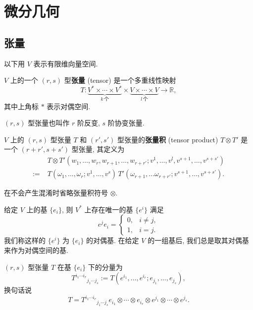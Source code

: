 \chapter{微分几何}
\label{differential geometry}
\section{张量}
\begin{remark}
    以下用 $ V $ 表示有限维向量空间.
\end{remark}
\begin{definition}[张量]
    $ V $ 上的一个 $ (r,s) $ 型{\bf 张量} (tensor) 是一个多重线性映射
    \[ T:\underbrace{V^*\times\cdots\times V^*}_{k\,\textrm{个}}\times \underbrace{V\times\cdots\times V}_{l\,\textrm{个}}\to\mathbb{R}, \]
    其中上角标 $ * $ 表示对偶空间. 
\end{definition}

\begin{remark}
    $ (r,s) $ 型张量也叫作 $ r $ 阶反变, $ s $ 阶协变张量.
\end{remark}

\begin{definition}[张量积]
    $ V $ 上的 $ (r,s) $ 型张量 $ T $ 和 $ (r',s') $ 型张量的{\bf 张量积} (tensor product) $ T\otimes T' $ 是一个 $ (r+r',s+s') $ 型张量, 其定义为
    \begin{align*}
        &T\otimes T' (w_1,\dots,w_r,w_{r+1},\dots,w_{r+r'};v^1,\dots,v^l,v^{s+1},\dots,v^{s+s'})\\
        :=\;&T(\omega_1,\dots,\omega_r;v^1,\dots,v^s)\,T'(\omega_{r+1},\dots\omega_{r+r'};v^{s+1},\dots,v^{s+s'}).
    \end{align*}
\end{definition}
\begin{remark}
    在不会产生混淆时省略张量积符号 $ \otimes $.
\end{remark}
给定 $V$ 上的基 $\{e_i\}$, 则 $V^*$ 上存在唯一的基 $\{e^i\}$ 满足
\[ e^je_i=\begin{cases}
        0, & i\neq j,\\ 1, & i=j.
    \end{cases} \]
我们称这样的 $\{e^i\}$ 为 $\{e_i\}$ 的对偶基. 在给定 $V$ 的一组基后, 我们总是取其对偶基来作为对偶空间的基.

\begin{definition}
	$(r,s)$ 型张量 $T$ 在基 $\{e_i\}$ 下的分量为
\[ T^{i_1\cdots i_r}{}_{j_1\cdots j_s}:=T(e^{i_1},\dots,e^{i_r};e_{j_1},\dots,e_{j_s}), \]
换句话说
\[ T=T^{i_1\cdots i_r}{}_{j_1\cdots j_s}e_{i_1}\otimes\cdots\otimes e_{i_r}\otimes e^{j_1}\otimes\cdots\otimes e^{j_s}. \] 
\end{definition}

